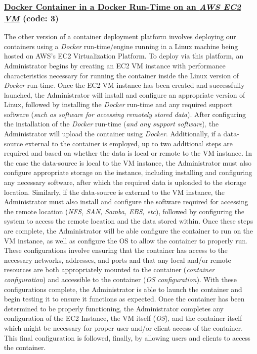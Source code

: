 \subsubsection{\underline{Docker Container in a Docker Run-Time on an \emph{AWS EC2 VM}} (code: \textbf{3})}
The other version of a container deployment platform involves deploying our containers using a \emph{Docker} run-time/engine running in a Linux machine being hosted on AWS's EC2 Virtualization Platform.  To deploy via this platform, an Administrator begins by creating an EC2 VM instance with performance characteristics necessary for running the container inside the Linux version of \emph{Docker} run-time.  Once the EC2 VM instance has been created and successfully launched, the Administrator will install and configure an appropriate version of Linux, followed by installing the \emph{Docker} run-time and any required support software (\emph{such as software for accessing remotely stored data}).  After configuring the installation of the \emph{Docker} run-time (\emph{and any support software}), the Administrator will upload the container using \emph{Docker}.  Additionally, if a data-source external to the container is employed, up to two additional steps are required and based on whether the data is local or remote to the VM instance.  In the case the data-source is local to the VM instance, the Administrator must also configure appropriate storage on the instance, including installing and configuring any necessary software, after which the required data is uploaded to the storage location.  Similarly, if the data-source is external to the VM instance, the Administrator must also install and configure the software required for accessing the remote location (\emph{NFS, SAN, Samba, EBS, etc}), followed by configuring the system to access the remote location and the data stored within.  Once these steps are complete, the Administrator will be able configure the container to run on the VM instance, as well as configure the OS to allow the container to properly run.  These configurations involve ensuring that the container has access to the necessary networks, addresses, and ports and that any local and/or remote resources are both appropriately mounted to the container (\emph{container configuration}) and accessible to the container (\emph{OS configuration}).  With these configurations complete, the Administrator is able to launch the container and begin testing it to ensure it functions as expected.  Once the container has been determined to be properly functioning, the Administrator completes any configuration of the EC2 Instance, the VM itself (\emph{OS}), and the container itself which might be necessary for proper user and/or client access of the container.  This final configuration is followed, finally, by allowing users and clients to access the container.


